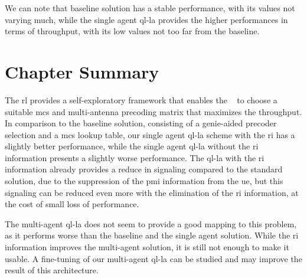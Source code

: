 We can note that baseline solution has a stable performance, with its values not varying much, while the single agent \gls{ql-la} provides the higher performances in terms of throughput, with its low values not too far from the baseline.



\section{Chapter Summary}
\label{sec:la-conclusion}
The \gls{rl} provides a self-exploratory framework that enables the \base~ to choose a suitable \gls{mcs} and multi-antenna precoding matrix that maximizes the throughput.
%
%
In comparison to the baseline solution, consisting of a genie-aided precoder selection and a \gls{mcs} lookup table, our single agent \gls{ql-la} scheme with the \gls{ri} has a slightly better performance, while the single agent \gls{ql-la} without the \gls{ri} information presents a slightly worse performance.
%
The \gls{ql-la} with the \gls{ri} information already provides a reduce in signaling compared to the standard solution, due to the suppression of the \gls{pmi} information from the \gls{ue}, but this signaling can be reduced even more with the elimination of the \gls{ri} information, at the cost of small loss of performance.

The multi-agent \gls{ql-la} does not seem to provide a good mapping to this problem, as it performs worse than the baseline and the single agent solution.
%
While the \gls{ri} information improves the multi-agent solution, it is still not enough to make it usable.
%
A fine-tuning of our multi-agent \gls{ql-la} can be studied and may improve the result of this architecture.


%
